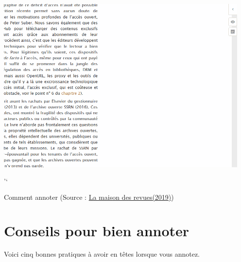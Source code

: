 \documentclass[
]{book}
\begin{document}
\includegraphics{img/img-5.png}

'`

Comment annoter (Source : \href{http://www.maisondesrevues.org/1182}{La maison des revues(2019)})

\hypertarget{s31}{%
\section{Conseils pour bien annoter}\label{s31}}

Voici cinq bonnes pratiques à avoir en têtes lorsque vous annotez.
\end{document}
